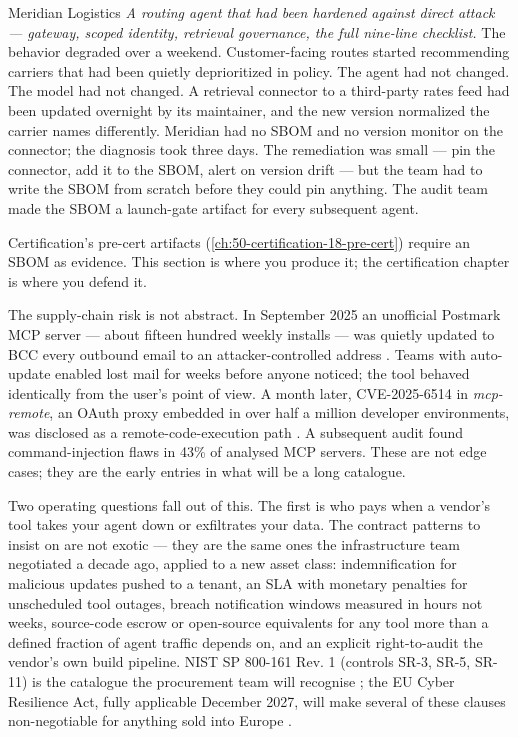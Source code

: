 \begin{TNinpractice}{Meridian Logistics} \textit{A routing agent that had been hardened against direct attack --- gateway, scoped identity, retrieval governance, the full nine-line checklist.} The behavior degraded over a weekend. Customer-facing routes started recommending carriers that had been quietly deprioritized in policy. The agent had not changed. The model had not changed. A retrieval connector to a third-party rates feed had been updated overnight by its maintainer, and the new version normalized the carrier names differently. Meridian had no SBOM and no version monitor on the connector; the diagnosis took three days. The remediation was small --- pin the connector, add it to the SBOM, alert on version drift --- but the team had to write the SBOM from scratch before they could pin anything. The audit team made the SBOM a launch-gate artifact for every subsequent agent.\end{TNinpractice}

Certification's pre-cert artifacts (\autoref{ch:50-certification-18-pre-cert}) require an SBOM as evidence. This section is where you produce it; the certification chapter is where you defend it.

The supply-chain risk is not abstract. In September 2025 an unofficial Postmark MCP server --- about fifteen hundred weekly installs --- was quietly updated to BCC every outbound email to an attacker-controlled address \citep{mcp-supply-chain-docker-2025}. Teams with auto-update enabled lost mail for weeks before anyone noticed; the tool behaved identically from the user's point of view. A month later, CVE-2025-6514 in \textit{mcp-remote}, an OAuth proxy embedded in over half a million developer environments, was disclosed as a remote-code-execution path \citep{cve-2025-6514-mcp-remote}. A subsequent audit found command-injection flaws in 43\% of analysed MCP servers. These are not edge cases; they are the early entries in what will be a long catalogue.

Two operating questions fall out of this. The first is who pays when a vendor's tool takes your agent down or exfiltrates your data. The contract patterns to insist on are not exotic --- they are the same ones the infrastructure team negotiated a decade ago, applied to a new asset class: indemnification for malicious updates pushed to a tenant, an SLA with monetary penalties for unscheduled tool outages, breach notification windows measured in hours not weeks, source-code escrow or open-source equivalents for any tool more than a defined fraction of agent traffic depends on, and an explicit right-to-audit the vendor's own build pipeline. NIST SP 800-161 Rev. 1 (controls SR-3, SR-5, SR-11) is the catalogue the procurement team will recognise \citep{nist-sp800-161r1}; the EU Cyber Resilience Act, fully applicable December 2027, will make several of these clauses non-negotiable for anything sold into Europe \citep{eu-cra-2024}.

